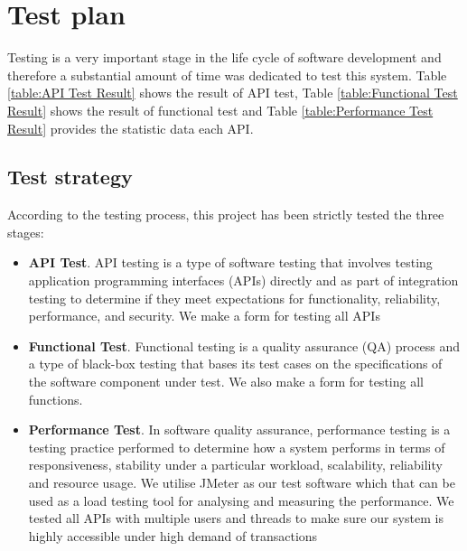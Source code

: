 \documentclass[runningheads]{llncs}
\begin{document}
\section{Test plan}
Testing is a very important stage in the life cycle of software development and therefore a substantial amount of time was dedicated to test this system. Table \ref{table:API Test Result} shows the result of API test, Table \ref{table:Functional Test Result} shows the result of functional test and Table \ref{table:Performance Test Result} provides the statistic data each API.

\subsection{Test strategy}
According to the testing process, this project has been strictly tested the three stages: 
\begin{itemize}
	\item \textbf{API Test}. API testing is a type of software testing that involves testing application programming interfaces (APIs) directly and as part of integration testing to determine if they meet expectations for functionality, reliability, performance, and security. We make a form for testing all APIs
	\item \textbf{Functional Test}. Functional testing is a quality assurance (QA) process\cite{wu2009qualityassurance} and a type of black-box testing that bases its test cases on the specifications of the software component under test. We also make a form for testing all functions.
	\item \textbf{Performance Test}. In software quality assurance, performance testing is a testing practice performed to determine how a system performs in terms of responsiveness, stability under a particular workload, scalability, reliability and resource usage. We utilise JMeter\cite{halili2008jemeter} as our test software which that can be used as a load testing tool for analysing and measuring the performance. We tested all APIs with multiple users and threads to make sure our system is highly accessible under high demand of transactions 
\end{itemize}
\end{document}
